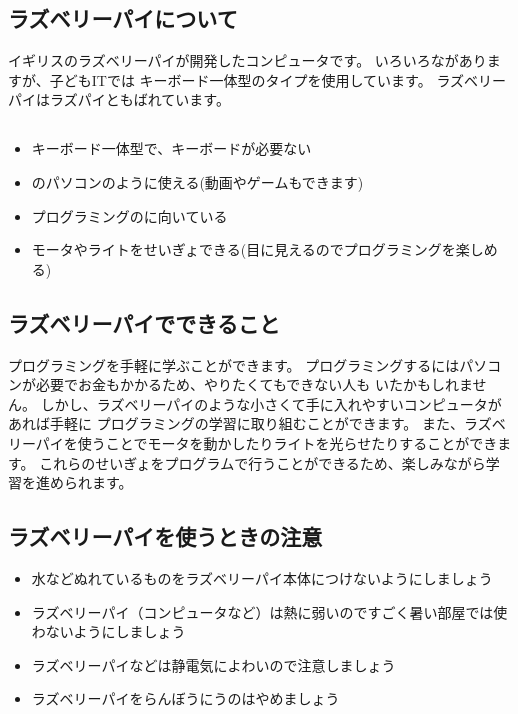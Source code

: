 \subsection{ラズベリーパイについて}

イギリスのラズベリーパイが開発したコンピュータです。
いろいろながありますが、子どもITでは
キーボード一体型のタイプを使用しています。
ラズベリーパイはラズパイともばれています。

% 
% 
\subsection{}

\begin{itemize}
  \item キーボード一体型で、キーボードが必要ない
  \item {}のパソコンのように使える(動画やゲームもできます)
  \item プログラミングのに向いている
  \item モータやライトをせいぎょできる(目に見えるのでプログラミングを楽しめる)
\end{itemize}

% 
% 
\subsection{ラズベリーパイでできること}

プログラミングを手軽に学ぶことができます。
プログラミングするにはパソコンが必要でお金もかかるため、やりたくてもできない人も
いたかもしれません。
しかし、ラズベリーパイのような小さくて手に入れやすいコンピュータがあれば手軽に
プログラミングの学習に取り組むことができます。
また、ラズベリーパイを使うことでモータを動かしたりライトを光らせたりすることができます。
これらのせいぎょをプログラムで行うことができるため、楽しみながら学習を進められます。

% 
% 
\subsection{ラズベリーパイを使うときの注意}

\begin{itemize}
  \item 水などぬれているものをラズベリーパイ本体につけないようにしましょう
  \item ラズベリーパイ（コンピュータなど）は熱に弱いのですごく暑い部屋では使わないようにしましょう
  \item ラズベリーパイなどは静電気によわいので注意しましょう
  \item ラズベリーパイをらんぼうにうのはやめましょう
\end{itemize}
\clearpage


